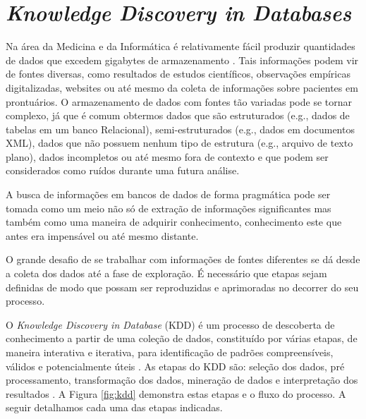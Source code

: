 \section{\emph{Knowledge Discovery in Databases}}

Na área da Medicina e da Informática é relativamente fácil produzir quantidades de dados que excedem gigabytes de armazenamento \cite{Holzinger2014}. Tais informações podem vir de fontes diversas, como resultados de estudos científicos, observações empíricas digitalizadas, websites ou até mesmo da coleta de informações sobre pacientes em prontuários. O armazenamento de dados com fontes tão variadas pode se tornar complexo, já que é comum obtermos dados que são estruturados (e.g., dados de tabelas em um banco Relacional), semi-estruturados (e.g., dados em documentos XML), dados que não possuem nenhum tipo de estrutura (e.g., arquivo de texto plano), dados incompletos ou até mesmo fora de contexto e que podem ser considerados como ruídos durante uma futura análise.

A busca de informações em bancos de dados de forma pragmática pode ser tomada como um meio não só de extração de informações significantes mas também como uma maneira de adquirir conhecimento, conhecimento este que antes era impensável ou até mesmo distante.

O grande desafio de se trabalhar com informações de fontes diferentes se dá desde a coleta dos dados até a fase de exploração. É necessário que etapas sejam definidas de modo que possam ser reproduzidas e aprimoradas no decorrer do seu processo.

O \emph{Knowledge Discovery in Database} (KDD) é um processo de descoberta de conhecimento a partir de uma coleção de dados, constituído por várias etapas, de maneira interativa e iterativa, para identificação de padrões compreensíveis, válidos e potencialmente úteis \cite{Fayyad1996}. As etapas do KDD são: seleção dos dados, pré processamento, transformação dos dados, mineração de dados e interpretação dos resultados \cite{Holzinger2014, Fayyad1996}. A Figura \ref{fig:kdd} demonstra estas etapas e o fluxo do processo. A seguir detalhamos cada uma das etapas indicadas.

